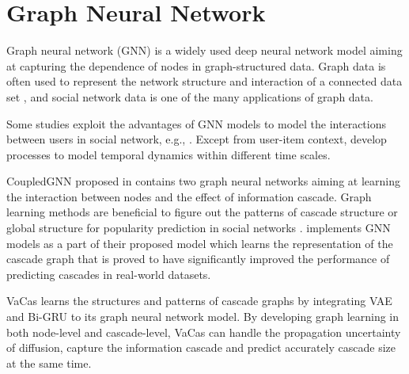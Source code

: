\section{Graph Neural Network}

Graph neural network (GNN) \cite{GNN} is a widely used deep neural network model aiming at capturing the dependence of nodes in graph-structured data. Graph data is often used to represent the network structure and interaction of a connected data set \cite{2021_Graph_Learning}, and social network data is one of the many applications of graph data. 

Some studies exploit the advantages of GNN models to model the interactions between users in social network, e.g.,  \cite{Wu_Mei_Cheng_Zhang_2016}. Except from user-item context, \cite{Wu_Mei_Cheng_Zhang_2016} develop processes to model temporal dynamics within different time scales. 

CoupledGNN proposed in \cite{cao2019popularity} contains two graph neural networks aiming at learning the interaction between nodes and the effect of information cascade. Graph learning methods are beneficial to figure out the patterns of cascade structure or global structure for popularity prediction in social networks \cite{10.1145/3331184.3331288}. \cite{10.1145/3331184.3331288} implements GNN models as a part of their proposed model which learns the representation of the cascade graph that is proved to have significantly improved the performance of predicting cascades in real-world datasets.

VaCas \cite{9155349} learns the structures and patterns of cascade graphs by integrating VAE and Bi-GRU to its graph neural network model. By developing graph learning in both node-level and cascade-level, VaCas can handle the propagation uncertainty of diffusion, capture the information cascade and predict accurately cascade size at the same time.